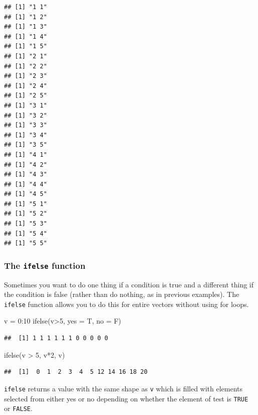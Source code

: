 \documentclass[
]{book}
\newenvironment{Shaded}{\begin{snugshade}}{\end{snugshade}}
\newcommand{\AttributeTok}[1]{\textcolor[rgb]{0.77,0.63,0.00}{#1}}
\newcommand{\DecValTok}[1]{\textcolor[rgb]{0.00,0.00,0.81}{#1}}
\newcommand{\FunctionTok}[1]{\textcolor[rgb]{0.00,0.00,0.00}{#1}}
\newcommand{\NormalTok}[1]{#1}
\newcommand{\OtherTok}[1]{\textcolor[rgb]{0.56,0.35,0.01}{#1}}
\newcommand{\SpecialCharTok}[1]{\textcolor[rgb]{0.00,0.00,0.00}{#1}}
\theoremstyle{definition}
\theoremstyle{definition}
\theoremstyle{definition}
\theoremstyle{definition}
\theoremstyle{remark}
\begin{document}
\begin{verbatim}
## [1] "1 1"
## [1] "1 2"
## [1] "1 3"
## [1] "1 4"
## [1] "1 5"
## [1] "2 1"
## [1] "2 2"
## [1] "2 3"
## [1] "2 4"
## [1] "2 5"
## [1] "3 1"
## [1] "3 2"
## [1] "3 3"
## [1] "3 4"
## [1] "3 5"
## [1] "4 1"
## [1] "4 2"
## [1] "4 3"
## [1] "4 4"
## [1] "4 5"
## [1] "5 1"
## [1] "5 2"
## [1] "5 3"
## [1] "5 4"
## [1] "5 5"
\end{verbatim}

\hypertarget{the-ifelse-function}{%
\subsubsection{\texorpdfstring{The \texttt{ifelse} function}{The ifelse function}}\label{the-ifelse-function}}

Sometimes you want to do one thing if a condition is true and a different thing if the condition is false (rather than do nothing, as in previous examples). The \texttt{ifelse} function allows you to do this for entire vectors without using for loops.

\begin{Shaded}
\begin{Highlighting}[]
\NormalTok{v }\OtherTok{=} \DecValTok{0}\SpecialCharTok{:}\DecValTok{10}
\FunctionTok{ifelse}\NormalTok{(v}\SpecialCharTok{\textgreater{}}\DecValTok{5}\NormalTok{, }\AttributeTok{yes =}\NormalTok{ T, }\AttributeTok{no =}\NormalTok{ F)}
\end{Highlighting}
\end{Shaded}

\begin{verbatim}
##  [1] 1 1 1 1 1 1 0 0 0 0 0
\end{verbatim}

\begin{Shaded}
\begin{Highlighting}[]
\FunctionTok{ifelse}\NormalTok{(v }\SpecialCharTok{\textgreater{}} \DecValTok{5}\NormalTok{, v}\SpecialCharTok{*}\DecValTok{2}\NormalTok{, v)}
\end{Highlighting}
\end{Shaded}

\begin{verbatim}
##  [1]  0  1  2  3  4  5 12 14 16 18 20
\end{verbatim}

\texttt{ifelse} returns a value with the same shape as \texttt{v} which is filled with elements selected from either yes or no depending on whether the element of test is \texttt{TRUE} or \texttt{FALSE}.
\end{document}
